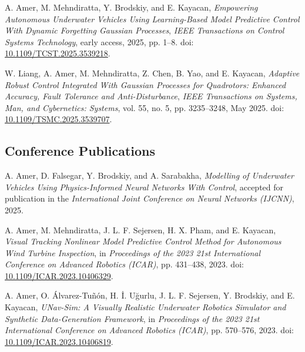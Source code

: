 \noindent A. Amer, M. Mehndiratta, Y. Brodskiy, and E. Kayacan, 
\textit{Empowering Autonomous Underwater Vehicles Using Learning-Based Model Predictive Control With Dynamic Forgetting Gaussian Processes},
\textit{IEEE Transactions on Control Systems Technology}, early access, 2025, pp. 1--8.
doi: \href{https://doi.org/10.1109/TCST.2025.3539218}{10.1109/TCST.2025.3539218}.

\vspace{0.8em}

\noindent W. Liang, A. Amer, M. Mehndiratta, Z. Chen, B. Yao, and E. Kayacan,
\textit{Adaptive Robust Control Integrated With Gaussian Processes for Quadrotors: Enhanced Accuracy, Fault Tolerance and Anti-Disturbance},
\textit{IEEE Transactions on Systems, Man, and Cybernetics: Systems},
vol. 55, no. 5, pp. 3235--3248, May 2025.
doi: \href{https://doi.org/10.1109/TSMC.2025.3539707}{10.1109/TSMC.2025.3539707}.

\vspace{1em}

\subsection*{Conference Publications}

\noindent A. Amer, D. Falsegar, Y. Brodskiy, and A. Sarabakha,
\textit{Modelling of Underwater Vehicles Using Physics-Informed Neural Networks With Control},
accepted for publication in the \textit{International Joint Conference on Neural Networks (IJCNN)}, 2025.

\vspace{0.8em}

\noindent A. Amer, M. Mehndiratta, J. L. F. Sejersen, H. X. Pham, and E. Kayacan,
\textit{Visual Tracking Nonlinear Model Predictive Control Method for Autonomous Wind Turbine Inspection},
in \textit{Proceedings of the 2023 21st International Conference on Advanced Robotics (ICAR)},
pp. 431--438, 2023.
doi: \href{https://ieeexplore.ieee.org/document/10406329}{10.1109/ICAR.2023.10406329}.

\vspace{0.8em}

\noindent A. Amer, O. Álvarez-Tuñón, H. İ. Uğurlu, J. L. F. Sejersen, Y. Brodskiy, and E. Kayacan,
\textit{UNav-Sim: A Visually Realistic Underwater Robotics Simulator and Synthetic Data-Generation Framework},
in \textit{Proceedings of the 2023 21st International Conference on Advanced Robotics (ICAR)},
pp. 570--576, 2023.
doi: \href{https://ieeexplore.ieee.org/document/10406819}{10.1109/ICAR.2023.10406819}.

